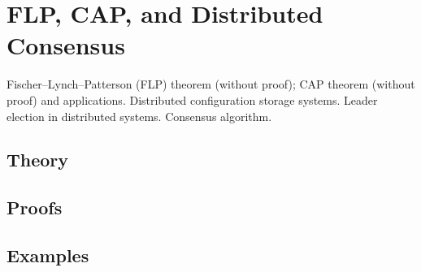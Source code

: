 
\section{FLP, CAP, and Distributed Consensus}
\label{sec:1.3.13-flp-cap-consensus}

\begin{ticket}
Fischer–Lynch–Patterson (FLP) theorem (without proof); CAP theorem (without proof) and applications. Distributed configuration storage systems. Leader election in distributed systems. Consensus algorithm.
\end{ticket}

\subsection*{Theory}

\subsection*{Proofs}

\subsection*{Examples}
